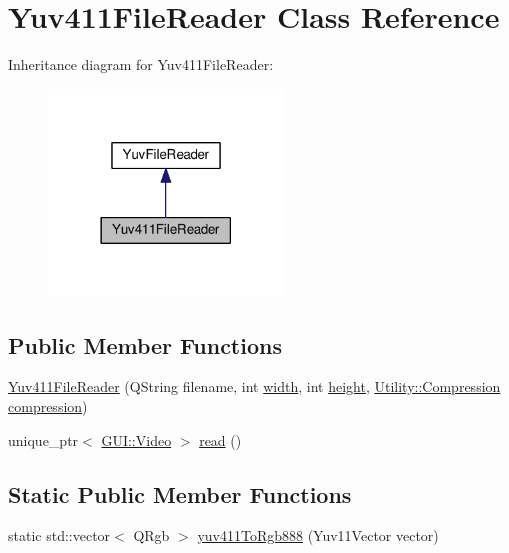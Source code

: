 \hypertarget{classUtility_1_1Yuv411FileReader}{}\section{Yuv411\+File\+Reader Class Reference}
\label{classUtility_1_1Yuv411FileReader}


Inheritance diagram for Yuv411\+File\+Reader\+:
\nopagebreak
\begin{figure}[H]
\begin{center}
\leavevmode
\includegraphics[width=177pt]{classUtility_1_1Yuv411FileReader__inherit__graph}
\end{center}
\end{figure}
\subsection*{Public Member Functions}
\begin{DoxyCompactItemize}
\item 
\hyperlink{classUtility_1_1Yuv411FileReader_af4e7eb4bd4929f14e6334ae7ac9dad6f}{Yuv411\+File\+Reader} (Q\+String filename, int \hyperlink{classUtility_1_1YuvFileReader_a2474a5474cbff19523a51eb1de01cda4}{width}, int \hyperlink{classUtility_1_1YuvFileReader_ad12fc34ce789bce6c8a05d8a17138534}{height}, \hyperlink{namespaceUtility_a56a83bf6847f4801f4205eb4be237ccf}{Utility\+::\+Compression} \hyperlink{classUtility_1_1Yuv411FileReader_aa484ffcb0c9f4d4dea91c6fae73f1fda}{compression})
\item 
unique\+\_\+ptr$<$ \hyperlink{classGUI_1_1Video}{G\+U\+I\+::\+Video} $>$ \hyperlink{classUtility_1_1Yuv411FileReader_ac6e45d1a396bdb81c8c8174bf5cc41c6}{read} ()
\end{DoxyCompactItemize}
\subsection*{Static Public Member Functions}
\begin{DoxyCompactItemize}
\item 
static std\+::vector$<$ Q\+Rgb $>$ \hyperlink{classUtility_1_1Yuv411FileReader_af6d2712d6e14bd1bb6cd0b7658ad71fb}{yuv411\+To\+Rgb888} (Yuv11\+Vector vector)
\end{DoxyCompactItemize}
